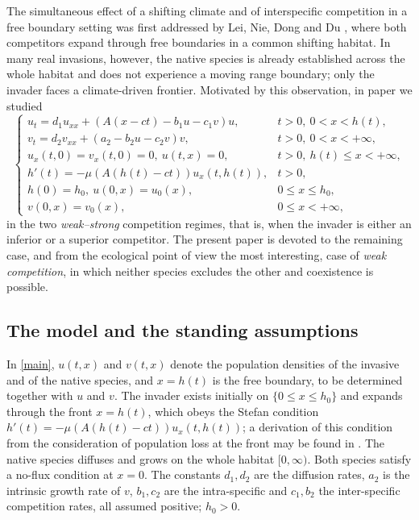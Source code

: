 \documentclass[reqno]{amsart}
\theoremstyle{plain}
\theoremstyle{definition}
\theoremstyle{remark}
\begin{document}
The simultaneous effect of a shifting climate and of interspecific competition in
a free boundary setting was first addressed by Lei, Nie, Dong and Du
\cite{Lei2018}, where both competitors expand through free boundaries in a common
shifting habitat. In many real invasions, however, the native species is already
established across the whole habitat and does not experience a moving range
boundary; only the invader faces a climate-driven frontier. Motivated by this
observation, in paper \cite{DLN2026a} we studied
\begin{equation}\label{main}
	\begin{cases}
		u_t = d_1u_{xx} + (A(x - ct) - b_1u - c_1 v) u, & t > 0,~ 0 < x < h(t), \\
		v_t = d_2v_{xx} + (a_2 - b_2u - c_2v)v, & t > 0,~ 0 < x < +\infty, \\
		u_x(t, 0) = v_x(t, 0) = 0, ~ u(t, x) = 0, & t > 0, ~ h(t) \leq x < +\infty, \\
		h'(t) = -\mu (A(h(t) - ct))u_x(t, h(t)), & t > 0, \\
		h(0)=h_0,~ u(0, x) = u_0(x), & 0 \leq x \leq h_0, \\
		v(0, x) = v_0(x), & 0 \le x < +\infty,
	\end{cases}
\end{equation}
in the two \emph{weak--strong} competition regimes, that is, when the invader is
either an inferior or a superior competitor. The present paper is devoted to the
remaining case, and from the ecological point of view the most interesting,
case of \emph{weak competition}, in which neither species excludes the other and
coexistence is possible.

\subsection{The model and the standing assumptions}

In \eqref{main}, $u(t,x)$ and $v(t,x)$ denote the population densities of the
invasive and of the native species, and $x=h(t)$ is the free boundary, to be
determined together with $u$ and $v$. The invader exists initially on
$\{0\le x\le h_0\}$ and expands through the front $x=h(t)$, which obeys the
Stefan condition $h'(t)=-\mu(A(h(t)-ct))u_x(t,h(t))$; a derivation of this
condition from the consideration of population loss at the front may be found in
\cite{MR3764580}. The native species diffuses and grows on the whole habitat
$[0,\infty)$. Both species satisfy a no-flux condition at $x=0$. The constants
$d_1,d_2$ are the diffusion rates, $a_2$ is the intrinsic growth rate of $v$,
$b_1,c_2$ are the intra-specific and $c_1,b_2$ the inter-specific competition
rates, all assumed positive; $h_0>0$.
\end{document}
